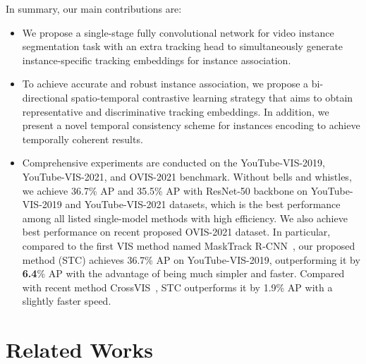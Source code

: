 \documentclass[runningheads]{llncs}
\begin{document}
In summary, our main contributions are: 
\begin{itemize}
    \item We propose a single-stage fully convolutional network for video instance segmentation task with an extra tracking head to simultaneously generate instance-specific tracking embeddings for instance association.
    \item To achieve accurate and robust instance association, we propose a bi-directional spatio-temporal contrastive learning strategy that aims to obtain representative and discriminative tracking embeddings. In addition, we present a novel temporal consistency scheme for instances encoding to achieve temporally coherent results.
    \item Comprehensive experiments are conducted on the YouTube-VIS-2019, YouTube-VIS-2021, and OVIS-2021 benchmark. Without bells and whistles, we achieve 36.7\% AP and 35.5\% AP with ResNet-50 backbone on YouTube-VIS-2019 and YouTube-VIS-2021 datasets, which is the best performance among all listed single-model methods with high efficiency. We also achieve best performance on recent proposed OVIS-2021 dataset. In particular, compared to the first VIS method named MaskTrack R-CNN~\cite{yang2019video}, our proposed method (STC) achieves 36.7\% AP on YouTube-VIS-2019, outperforming it by \textbf{6.4}\% AP with the advantage of being much simpler and faster. Compared with recent method CrossVIS~\cite{yang2021crossover}, STC outperforms it by 1.9\% AP with a slightly faster speed. 
\end{itemize} \section{Related Works}
\end{document}
